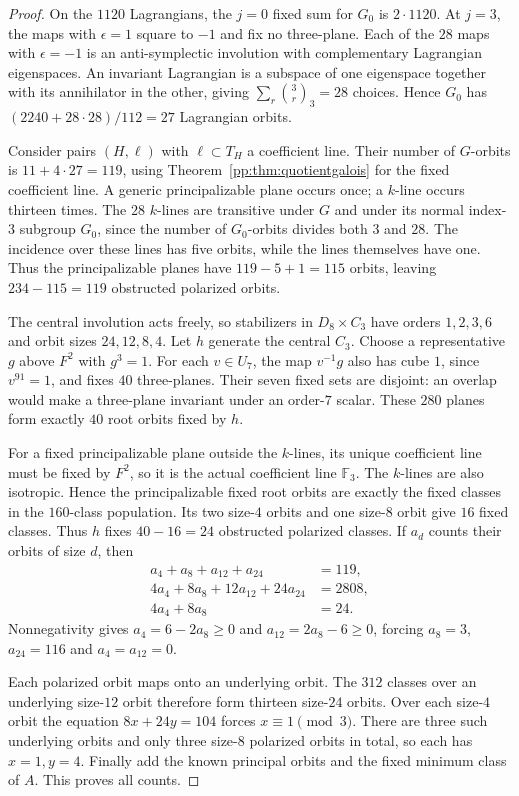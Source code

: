 \begin{proof}
On the $1120$ Lagrangians, the $j=0$ fixed sum for $G_0$ is
$2\cdot1120$. At $j=3$, the maps with $\epsilon=1$ square to
$-1$ and fix no three-plane. Each of the $28$ maps with
$\epsilon=-1$ is an anti-symplectic involution with complementary
Lagrangian eigenspaces. An invariant Lagrangian is a subspace of
one eigenspace together with its annihilator in the other, giving
$\sum_r\binom{3}{r}_3=28$ choices. Hence $G_0$ has
$(2240+28\cdot28)/112=27$ Lagrangian orbits.

Consider pairs $(H,\ell)$ with $\ell\subset T_H$ a coefficient
line. Their number of $G$-orbits is $11+4\cdot27=119$, using
Theorem~\ref{pp:thm:quotientgalois} for the fixed coefficient line.
A generic principalizable plane occurs once; a $k$-line occurs
thirteen times. The $28$ $k$-lines are transitive under $G$ and
under its normal index-$3$ subgroup $G_0$, since the number of
$G_0$-orbits divides both $3$ and $28$. The incidence over these
lines has five orbits, while the lines themselves have one.
Thus the principalizable planes have $119-5+1=115$ orbits, leaving
$234-115=119$ obstructed polarized orbits.

The central involution acts freely, so stabilizers in $D_8\times C_3$
have orders $1,2,3,6$ and orbit sizes $24,12,8,4$. Let $h$ generate
the central $C_3$. Choose a representative $g$ above $F^2$ with
$g^3=1$. For each $v\in U_7$, the map $v^{-1}g$ also has cube
$1$, since $v^{91}=1$, and fixes $40$ three-planes. Their seven
fixed sets are disjoint: an overlap would make a three-plane
invariant under an order-$7$ scalar. These $280$ planes form
exactly $40$ root orbits fixed by $h$.

For a fixed principalizable plane outside the $k$-lines, its
unique coefficient line must be fixed by $F^2$, so it is the
actual coefficient line $\mathbb F_3$. The $k$-lines are also
isotropic. Hence the principalizable fixed root orbits are exactly
the fixed classes in the $160$-class population. Its two size-$4$
orbits and one size-$8$ orbit give $16$ fixed classes. Thus $h$
fixes $40-16=24$ obstructed polarized classes. If $a_d$ counts
their orbits of size $d$, then
\[
\begin{split}
 a_4+a_8+a_{12}+a_{24}&=119,\\
 4a_4+8a_8+12a_{12}+24a_{24}&=2808,\\
 4a_4+8a_8&=24.
\end{split}
\]
Nonnegativity gives $a_4=6-2a_8\ge0$ and
$a_{12}=2a_8-6\ge0$, forcing $a_8=3$, $a_{24}=116$ and
$a_4=a_{12}=0$.

Each polarized orbit maps onto an underlying orbit. The $312$
classes over an underlying size-$12$ orbit therefore form thirteen
size-$24$ orbits. Over each size-$4$ orbit the equation
$8x+24y=104$ forces $x\equiv1\pmod3$. There are three such
underlying orbits and only three size-$8$ polarized orbits in total,
so each has $x=1,y=4$. Finally add the known principal orbits and
the fixed minimum class of $A$. This proves all counts.
\end{proof}

